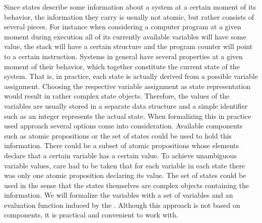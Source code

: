 \documentclass[preview]{standalone}
\begin{document}
Since states describe some information about a system at a certain moment of its behavior, the information they carry is usually not atomic, but rather consists of several pieces. For instance when considering a computer program at a given moment during execution all of its currently available variables will have some value, the stack will have a certain structure and the program counter will point to a certain instruction. Systems in general have several properties at a given moment of their behavior, which together constitute the current state of the system. That is, in practice, each state is actually derived from a possible variable assignment. Choosing the respective variable assignment as state representation would result in rather complex state objects. Therefore, the values of the variables are usually stored in a separate data structure and a simple identifier such as an integer represents the actual state. When formalizing this in practice used approach several options come into consideration. Available \mdpN components such as atomic propositions or the set of states could be used to hold this information. There could be a subset of atomic propositions whose elements declare that a certain variable has a certain value. To achieve unambiguous variable values, care had to be taken that for each variable in each state there was only one atomic proposition declaring its value. The set of states could be used in the sense that the states themselves are complex objects containing the information. We will formalize the variables with a set of variables and an evaluation function induced by the \mdpN. Although this approach is not based on \mdpN components, it is practical and convenient to work with.
\end{document}
